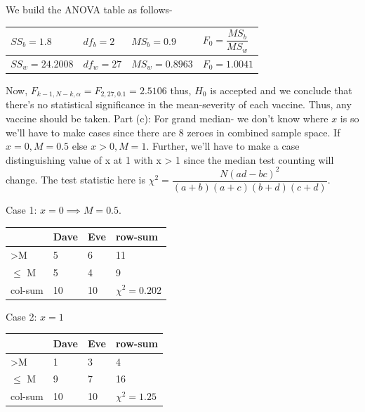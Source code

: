 \documentclass[12pt, oneside]{article}
\begin{document}
\begin{enumerate}
We build the ANOVA table as follows-
\begin{table}[!ht]
\centering
\begin{tabular}{|l|l|l|l|}
\hline
$SS_b = 1.8$ & $df_b = 2$ & $MS_b = 0.9$ & $F_0 = \dfrac{MS_b}{MS_w}$ \\ \hline
$SS_w = 24.2008$ & $df_w = 27$ & $MS_w = 0.8963$ & $F_0 = 1.0041$                   \\ \hline
\end{tabular}
\end{table}
Now, $F_{k-1,N-k,\alpha} = F_{2,27,0.1} = 2.5106$ thus, $H_0$ is accepted and we conclude that there's no statistical significance in the mean-severity of each vaccine. Thus, any vaccine should be taken. 
\newline Part (c): For grand median- we don't know where $x$ is so we'll have to make cases since there are 8 zeroes in combined sample space. If $x = 0, M = 0.5$ else $x > 0, M = 1$. Further, we'll have to make a case distinguishing value of x at 1 with x > 1 since the median test counting will change. The test statistic here is $\chi^2 = \dfrac{N(ad-bc)^2}{(a+b)(a+c)(b+d)(c+d)}$. 

Case 1: $x = 0 \implies M =0.5$.
\begin{table}[!ht]
\centering
\begin{tabular}{|l|l|l|l|}
\hline
               & Dave & Eve & row-sum          \\ \hline
\textgreater M & 5    & 6   & 11               \\ \hline
$\le$ M        & 5    & 4   & 9                \\ \hline
col-sum        & 10   & 10  & $\chi^2 = 0.202$ \\ \hline
\end{tabular}
\end{table}

Case 2: $x = 1$
\begin{table}[!ht]
\centering
\begin{tabular}{|l|l|l|l|}
\hline
               & Dave & Eve & row-sum          \\ \hline
\textgreater M & 1    & 3   & 4               \\ \hline
$\le$ M        & 9    & 7   & 16                \\ \hline
col-sum        & 10   & 10  & $\chi^2 = 1.25$ \\ \hline
\end{tabular}
\end{table}


\end{enumerate}
\end{document}
